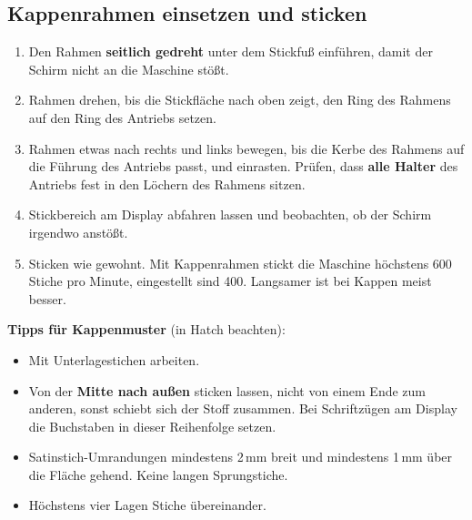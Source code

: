 \documentclass{\basedir/fablab-document}
\begin{document}
	\subsection{Kappenrahmen einsetzen und sticken}
	\begin{enumerate}
		\item Den Rahmen \textbf{seitlich gedreht} unter dem Stickfuß einführen, damit der Schirm nicht an die Maschine stößt.
		\item Rahmen drehen, bis die Stickfläche nach oben zeigt, den Ring des Rahmens auf den Ring des Antriebs setzen.
		\item Rahmen etwas nach rechts und links bewegen, bis die Kerbe des Rahmens auf die Führung des Antriebs passt, und einrasten. Prüfen, dass \textbf{alle Halter} des Antriebs fest in den Löchern des Rahmens sitzen.
		\item Stickbereich am Display abfahren lassen und beobachten, ob der Schirm irgendwo anstößt.
		\item Sticken wie gewohnt. Mit Kappenrahmen stickt die Maschine höchstens 600 Stiche pro Minute, eingestellt sind 400. Langsamer ist bei Kappen meist besser.
	\end{enumerate}

	\textbf{Tipps für Kappenmuster} (in Hatch beachten):
	\begin{itemize}
		\item Mit Unterlagestichen arbeiten.
		\item Von der \textbf{Mitte nach außen} sticken lassen, nicht von einem Ende zum anderen, sonst schiebt sich der Stoff zusammen. Bei Schriftzügen am Display die Buchstaben in dieser Reihenfolge setzen.
		\item Satinstich-Umrandungen mindestens 2\,mm breit und mindestens 1\,mm über die Fläche gehend. Keine langen Sprungstiche.
		\item Höchstens vier Lagen Stiche übereinander.
	\end{itemize}
\end{document}
